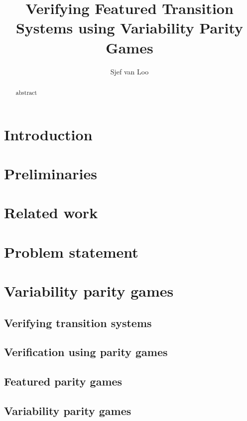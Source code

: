 \documentclass[]{article}
\title{Verifying Featured Transition Systems using Variability Parity Games}
\author{Sjef van Loo}
\theoremstyle{definition}
\begin{document}
\maketitle
\begin{abstract}
	abstract
\end{abstract}

\newpage
\tableofcontents

\pagebreak
\section{Introduction}


\section{Preliminaries}


\section{Related work}


\section{Problem statement}


\pagebreak
\section{Variability parity games}
\label{part:verifying}

\subsection{Verifying transition systems}


\subsection{Verification using parity games}


\subsection{Featured parity games}


\subsection{Variability parity games}

\end{document}
